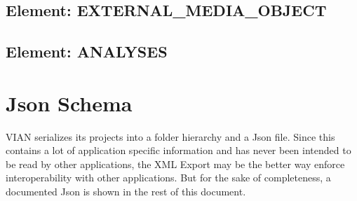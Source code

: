 \documentclass[11pt, a4paper,oneside,chapterprefix=false]{scrbook}
\begin{document}
\subsection{Element: EXTERNAL\_MEDIA\_OBJECT}


\subsection{Element: ANALYSES}



\newpage
\section{Json Schema}
VIAN serializes its projects into a folder hierarchy and a Json file. Since this contains a lot of application specific information and has never been intended to be read by other applications, the XML Export may be the better way enforce interoperability with other applications. But for the sake of completeness, a documented Json is shown in the rest of this document. 

\end{document}
